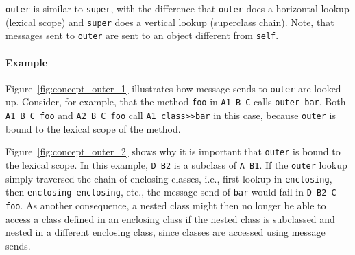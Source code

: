 \texttt{outer} is similar to \texttt{super}, with the difference that \texttt{outer} does a horizontal lookup (lexical scope) and \texttt{super} does a vertical lookup (superclass chain). Note, that messages sent to \texttt{outer} are sent to an object different from \texttt{self}.

\paragraph{Example}
Figure~\ref{fig:concept_outer_1} illustrates how message sends to \texttt{outer} are looked up. Consider, for example, that the method \texttt{foo} in \texttt{A1 B C} calls \texttt{outer bar}. Both \texttt{A1 B C foo} and \texttt{A2 B C foo} call \texttt{A1 class>>bar} in this case, because \texttt{outer} is bound to the lexical scope of the method.

Figure~\ref{fig:concept_outer_2} shows why it is important that \texttt{outer} is bound to the lexical scope. In this example, \texttt{D B2} is a subclass of \texttt{A B1}. If the \texttt{outer} lookup simply traversed the chain of enclosing classes, i.e., first lookup in \texttt{enclosing}, then \texttt{enclosing enclosing}, etc., the message send of \texttt{bar} would fail in \texttt{D B2 C foo}. As another consequence, a nested class might then no longer be able to access a class defined in an enclosing class if the nested class is subclassed and nested in a different enclosing class, since classes are accessed using message sends.

